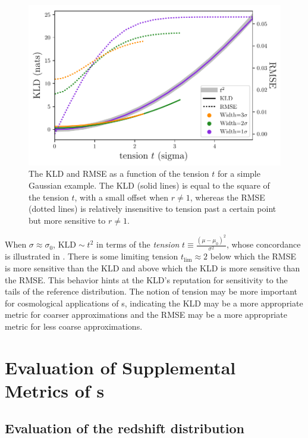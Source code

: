 \begin{figure}
	\begin{center}
		\includegraphics[width=0.74\columnwidth]{figures/qp/tension.pdf}
		\caption[The KLD and RMSE as a function of the tension $t$ for a simple 
		Gaussian example]
		{The KLD and RMSE as a function of the tension $t$ for a simple 
			Gaussian example.
			The KLD (solid lines) is equal to the square of the tension $t$, with a 
			small offset when $r\neq1$, whereas the RMSE (dotted lines) is relatively 
			insensitive to tension past a certain point but more sensitive to $r\neq1$.
			}
	\end{center}
\end{figure}

When $\sigma\approx\sigma_{0}$, $\mathrm{KLD}\sim t^{2}$ in terms of the 
\textit{tension} $t\equiv\frac{(\mu-\mu_{0})^{2}}{\sigma^{2}}$, whose 
concordance is illustrated in .
There is some limiting tension $t_{\mathrm{lim}}\approx2$ below which the RMSE 
is more sensitive than the KLD and above which the KLD is more sensitive than 
the RMSE.
This behavior hints at the KLD's reputation for sensitivity to the tails of the 
reference distribution.
The notion of tension may be more important for cosmological applications of 
\pz s, indicating the KLD may be a more appropriate metric for coarser 
approximations and the RMSE may be a more appropriate metric for less coarse 
approximations.


\section{Evaluation of Supplemental Metrics of \Pzpdf s}
\label{app:pzdc1}

\subsection{Evaluation of the redshift distribution}
\label{sec:moments}

